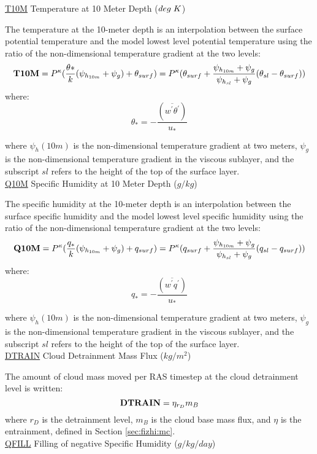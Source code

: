 \noindent
{ \underline {T10M}  Temperature at 10 Meter Depth ($deg \hspace{.1cm} K$) }

\noindent
The temperature at the 10-meter depth is an interpolation between the surface potential 
temperature and the model lowest level potential temperature using the ratio of the 
non-dimensional temperature gradient at the two levels:
\[
{\bf T10M} = P^{\kappa} (\frac{\theta*}{k} ({\psi_{h_{10m}}+\psi_g}) + \theta_{surf} ) = 
P^{\kappa}(\theta_{surf} + \frac{\psi_{h_{10m}}+\psi_g}{\psi_{h_{sl}}+\psi_g}
(\theta_{sl} - \theta_{surf})) 
\]
where:
\[
\theta_* = - \frac{ (\overline{w^{\prime}\theta^{\prime}}) }{ u_* }
\]

\noindent
where $\psi_h(10m)$ is the non-dimensional temperature gradient at two meters, $\psi_g$ is
the non-dimensional temperature gradient in the viscous sublayer, and the subscript
$sl$ refers to the height of the top of the surface layer.
\\
 
\noindent
{ \underline {Q10M}  Specific Humidity at 10 Meter Depth ($g/kg$) }

\noindent
The specific humidity at the 10-meter depth is an interpolation between the surface specific 
humidity and the model lowest level specific humidity using the ratio of the 
non-dimensional temperature gradient at the two levels:
\[
{\bf Q10M} = P^{\kappa} (\frac{q_*}{k} ({\psi_{h_{10m}}+\psi_g}) + q_{surf} ) = 
P^{\kappa}(q_{surf} + \frac{\psi_{h_{10m}}+\psi_g}{\psi_{h_{sl}}+\psi_g}
(q_{sl} - q_{surf})) 
\]
where:
\[
q_* =  - \frac{ (\overline{w^{\prime}q^{\prime}}) }{ u_* }
\]

\noindent
where $\psi_h(10m)$ is the non-dimensional temperature gradient at two meters, $\psi_g$ is
the non-dimensional temperature gradient in the viscous sublayer, and the subscript
$sl$ refers to the height of the top of the surface layer.
\\
 
\noindent
{ \underline {DTRAIN} Cloud Detrainment Mass Flux ($kg/m^2$) } 

The amount of cloud mass moved per RAS timestep at the cloud detrainment level is written:
\[
{\bf DTRAIN} = \eta_{r_D}m_B
\]
\noindent
where $r_D$ is the detrainment level, 
$m_B$ is the cloud base mass flux, and $\eta$
is the entrainment, defined in Section \ref{sec:fizhi:mc}.
\\

\noindent
{ \underline {QFILL}  Filling of negative Specific Humidity ($g/kg/day$) }


